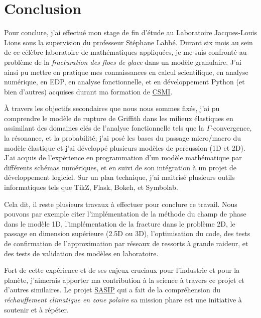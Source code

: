 
\chapter{Conclusion} %

\label{Chapter6} %



Pour conclure, j'ai effectué mon stage de fin d'étude au Laboratoire Jacques-Louis Lions sous la supervision du professeur Stéphane Labbé. Durant six mois au sein de ce célèbre laboratoire de mathématiques appliquées, je me suis confronté au problème de la \emph{fracturation des floes de glace} dans un modèle granulaire. J'ai ainsi pu mettre en pratique mes connaissances en calcul scientifique, en analyse numérique, en EDP, en analyse fonctionnelle, et en développement Python (et bien d'autres) acquises durant ma formation de \href{https://www.unistra.fr/etudes/decouvrir-nos-formations/par-facultes-ecoles-instituts/sciences-technologies/ufr-de-mathematique-et-dinformatique/ufr-de-mathematique-et-dinformatique/cursus/ME195?cHash=3aa4f04702a03e944ed933056abe17f2}{CSMI}. 

À travers les objectifs secondaires que nous nous sommes fixés, j'ai pu comprendre le modèle de rupture de Griffith dans les milieux élastiques en assimilant des domaines clés de l'analyse fonctionnelle tels que la $\Gamma$-convergence, la résonance, et la probabilité; j'ai posé les bases du passage micro/macro du modèle élastique et j'ai développé plusieurs modèles de percussion (1D et 2D). J'ai acquis de l'expérience en programmation d’un modèle mathématique par différents schémas numériques, et en suivi de son intégration à un projet de développement logiciel. Sur un plan technique, j'ai maitrisé plusieurs outils informatiques tels que TikZ, Flask, Bokeh, et Symbolab.

Cela dit, il reste plusieurs travaux à effectuer pour conclure ce travail. Nous pouvons par exemple citer l'implémentation de la méthode du champ de phase dans le modèle 1D, l'implémentation de la fracture dans le problème 2D, le passage en dimension supérieure (2.5D ou 3D), l'optimisation du code, des tests de confirmation de l'approximation par réseaux de ressorts à grande raideur, et des tests de validation des modèles en laboratoire.

Fort de cette expérience et de ses enjeux cruciaux pour l'industrie et pour la planète, j'aimerais apporter ma contribution à la science à travers ce projet et d'autres similaires. Le projet \href{https://sasip-climate.github.io/}{SASIP} qui a fait de la compréhension du \emph{réchauffement climatique en zone polaire} sa mission phare est une initiative à soutenir et à répéter.